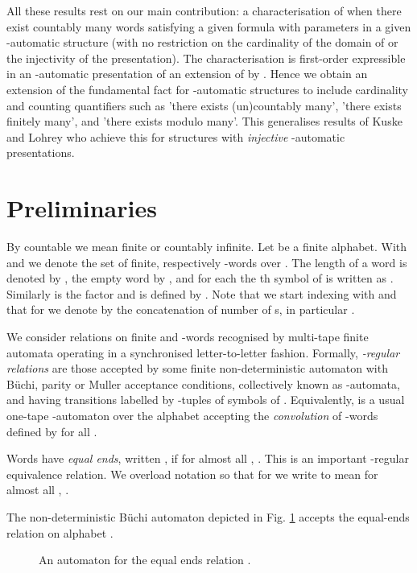 \documentclass{stacs_proc}
\begin{document}
All these results rest on our main contribution: a characterisation of when
there exist countably many words  satisfying a given formula with parameters
in a given -automatic structure  (with no restriction on the cardinality
of the domain of  or the injectivity of the presentation). The
characterisation is first-order expressible in an -automatic
presentation of an extension of  by .
Hence we obtain an extension of the fundamental fact for -automatic
structures to include cardinality and counting quantifiers such as 'there exists
(un)countably many', 'there exists finitely many', and 'there exists  modulo
 many'.  This generalises results of Kuske and Lohrey \cite{KL06} who achieve
this for structures with \emph{injective} -automatic presentations.
 


\vskip-0.3cm
\section{Preliminaries} \label{sec_prelim}



By countable we mean finite or countably infinite. 
Let  be a finite alphabet. With  and 
we denote the set of finite, respectively -words over .
The length of a word  is denoted by ,
the empty word by , 
and for each  the th symbol of  is written as . 
Similarly  is the factor  and  is defined
by .
Note that we start indexing with  and that for  we
denote by  the concatenation of  number of s, in particular
. 

We consider relations on finite and -words recognised by multi-tape
finite automata operating in a synchronised letter-to-letter fashion.
Formally, \emph{-regular relations} are those accepted by some
finite non-deterministic automaton  with B\"uchi, parity or Muller
acceptance conditions, collectively known as -automata,
and having transitions labelled by -tuples of symbols of .
Equivalently,  is a usual one-tape -automaton over the
alphabet  accepting the \emph{convolution}  of
-words  defined by 
 for all .


Words  have {\em equal ends}, written , if
for almost all , .  This is an important
-regular equivalence relation. We overload notation so that for  we write  to mean for almost all , .
 
\begin{example}\label{ex_1} The non-deterministic B\"uchi automaton depicted in
Fig. \ref{fig_ex1} accepts the equal-ends relation on alphabet . 

\begin{figure}[h]

\caption{An automaton for the equal ends relation .}
\label{fig_ex1}
\end{figure}
\end{example}
\end{document}
